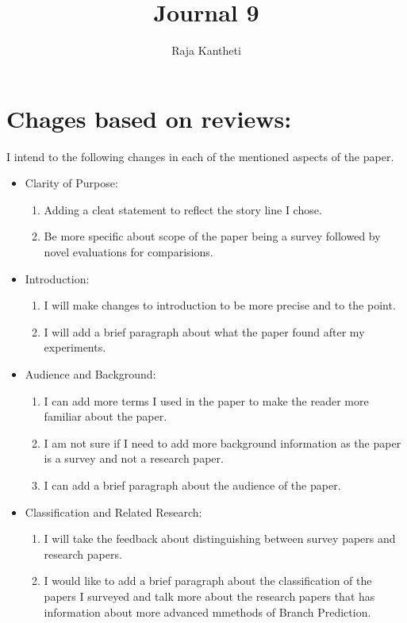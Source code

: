 \documentclass{article}[12pt]
\title{Journal 9}
\author{Raja Kantheti}
\begin{document}
\maketitle
\section*{Chages based on reviews: }
I intend to the following changes in each of the mentioned aspects of the paper.
\begin{itemize}
    \item Clarity of Purpose:
    \begin{enumerate}
        \item Adding a cleat statement to reflect the story line I chose.
        \item Be more specific about scope of the paper being a survey followed by novel evaluations for comparisions. 
    \end{enumerate}
    \item Introduction:
    \begin{enumerate}
        \item I will make changes to introduction to be more precise and to the point.
        \item I will add a brief paragraph about what the paper found after my experiments. 
    \end{enumerate}
    \item Audience and Background:
    \begin{enumerate}
        \item I can add more terms I used in the paper to make the reader more familiar about the paper. 
        \item I am not sure if I need to add more background information as the paper is a survey and not a research paper.
        \item I can add a brief paragraph about the audience of the paper.
    \end{enumerate}
    \item Classification and Related Research:
    \begin{enumerate}
        \item I will take the feedback about distinguishing between survey papers and research papers.
        \item I would like to add a brief paragraph about the classification of the papers I surveyed and talk more about the research papers that has information about more advanced mmethods of Branch Prediction.
    \end{enumerate}

\end{itemize}
\end{document}
